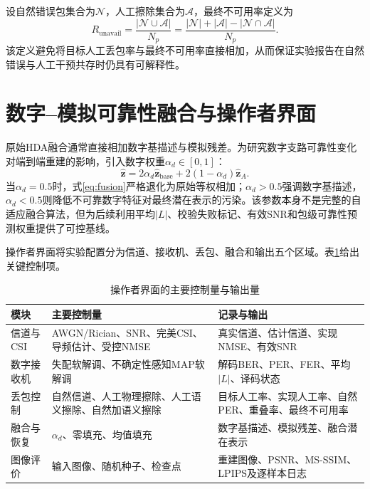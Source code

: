 \documentclass[conference]{IEEEtran}
\begin{document}
设自然错误包集合为$\mathcal N$，人工擦除集合为$\mathcal A$，最终不可用率定义为
\begin{equation}
    R_{\mathrm{unavail}}=\frac{|\mathcal N\cup\mathcal A|}{N_p}
    =\frac{|\mathcal N|+|\mathcal A|-|\mathcal N\cap\mathcal A|}{N_p}.
    \label{eq:unavailable}
\end{equation}
该定义避免将目标人工丢包率与最终不可用率直接相加，从而保证实验报告在自然错误与人工干预共存时仍具有可解释性。

\section{数字--模拟可靠性融合与操作者界面}
原始HDA融合通常直接相加数字基描述与模拟残差。为研究数字支路可靠性变化对端到端重建的影响，引入数字权重$\alpha_d\in[0,1]$：
\begin{equation}
    \hat{\bm z}=2\alpha_d\hat{\bm z}_{\mathrm{base}}
    +2(1-\alpha_d)\hat{\bm z}_A.
    \label{eq:fusion}
\end{equation}
当$\alpha_d=0.5$时，式\eqref{eq:fusion}严格退化为原始等权相加；$\alpha_d>0.5$强调数字基描述，$\alpha_d<0.5$则降低不可靠数字特征对最终潜在表示的污染。该参数本身不是完整的自适应融合算法，但为后续利用平均$|L|$、校验失败标记、有效SNR和包级可靠性预测权重提供了可控基线。

操作者界面将实验配置分为信道、接收机、丢包、融合和输出五个区域。表\ref{tab:ui}给出关键控制项。

\begin{table}[t]
\centering
\caption{操作者界面的主要控制量与输出量}
\label{tab:ui}
\begin{tabular}{p{2.6cm} p{4.7cm} p{8.2cm}}
\toprule
模块 & 主要控制量 & 记录与输出 \\
\midrule
信道与CSI & AWGN/Rician、SNR、完美CSI、导频估计、受控NMSE & 真实信道、估计信道、实现NMSE、有效SNR \\
数字接收机 & 失配软解调、不确定性感知MAP软解调 & 解码BER、PER、FER、平均$|L|$、译码状态 \\
丢包控制 & 自然信道、人工物理擦除、人工语义擦除、自然加语义擦除 & 目标人工率、实现人工率、自然PER、重叠率、最终不可用率 \\
融合与恢复 & $\alpha_d$、零填充、均值填充 & 数字基描述、模拟残差、融合潜在表示 \\
图像评价 & 输入图像、随机种子、检查点 & 重建图像、PSNR、MS-SSIM、LPIPS及逐样本日志 \\
\bottomrule
\end{tabular}
\end{table}
\end{document}
